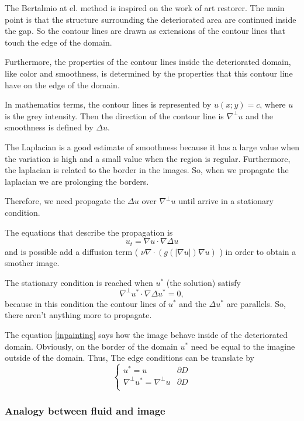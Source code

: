 The Bertalmio at el. method is inspired on the work of art restorer. The main point is that the structure surrounding the deteriorated area are continued inside the gap. So the contour lines are drawn as extensions of the contour lines that touch the edge of the domain.

Furthermore, the properties of the contour lines inside the deteriorated domain, like color and smoothness, is determined by the properties that this contour line have on the edge of the domain.

In mathematics terms, the contour lines is represented by $u(x; y) = c $, where $u$ is the grey intensity. Then the direction of the contour line is $\nabla^\bot u$ and the smoothness is defined by $\Delta u$.

The Laplacian is a good estimate of smoothness because it has a large value when the variation is high and a small value when the region is regular.
Furthermore, the laplacian is related to the border in the images. So, when we propagate the laplacian we are prolonging the borders.

Therefore, we need propagate the $\Delta u$ over $\nabla^\bot u$ until arrive in a stationary condition.

The equations that describe the propagation is 
\begin{equation}\label{inpainting}
u_t =\nabla u \cdot \nabla \Delta u
\end{equation}
and is possible add a diffusion term ( $\nu\nabla\cdot(g(|\nabla u|)\nabla u)$ ) in order to obtain a smother image.

The stationary condition is reached when $u^*$ (the solution) satisfy \[\nabla^\bot u^* \cdot \nabla \Delta u^* = 0,\] because in this condition the contour lines of $u^*$  and the $\Delta u^*$ are parallels. So, there aren't anything more to propagate.

The equation \eqref{inpainting} says how the image behave inside of the deteriorated domain. Obviously, on the border of the domain $u^*$ need be equal to the imagine outside of the domain. Thus, The edge conditions can be translate by 
\[\begin{cases} u^*=u & \partial D  \\
		\nabla^\bot u^*  = \nabla^\bot u  & \partial D \\ \end{cases} \]


\subsubsection{Analogy between fluid and image}

